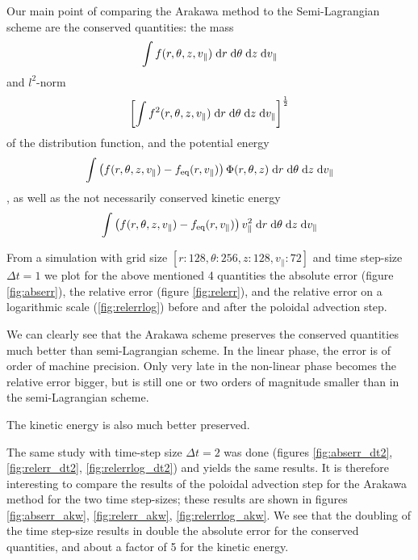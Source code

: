 Our main point of comparing the Arakawa method to the Semi-Lagrangian scheme are the conserved quantities: the mass
\begin{equation}
	\int f(r, \theta, z, v_\parallel) \;\text{d} r \;\text{d} \theta \;\text{d} z \;\text{d} v_\parallel
\end{equation}
and $l^2$-norm
\begin{equation}
	\left[\int f^2(r, \theta, z, v_\parallel) \;\text{d} r \;\text{d} \theta \;\text{d} z \;\text{d} v_\parallel\right]^\frac{1}{2}
\end{equation}
of the distribution function, and the potential energy
\begin{equation}
	\int \left(f(r, \theta, z, v_\parallel) - f_\text{eq}(r, v_\parallel)\right) \Phi(r, \theta, z) \;\text{d} r \;\text{d} \theta \;\text{d} z \;\text{d} v_\parallel
\end{equation}
, as well as the not necessarily conserved kinetic energy
\begin{equation}
	\int \left(f(r, \theta, z, v_\parallel) - f_\text{eq}(r, v_\parallel)\right) v^2_\parallel \;\text{d} r \;\text{d} \theta \;\text{d} z \;\text{d} v_\parallel
\end{equation}

From a simulation with grid size $[r:128, \theta:256, z:128, v_\parallel :72]$ and time step-size $\Delta t = 1$ we plot for the above mentioned 4 quantities the absolute error (figure \ref{fig:abserr}), the relative error (figure \ref{fig:relerr}), and the relative error on a logarithmic scale (\ref{fig:relerrlog}) before and after the poloidal advection step.

We can clearly see that the Arakawa scheme preserves the conserved quantities much better than semi-Lagrangian scheme. In the linear phase, the error is of order of machine precision. Only very late in the non-linear phase becomes the relative error bigger, but is still one or two orders of magnitude smaller than in the semi-Lagrangian scheme.

The kinetic energy is also much better preserved.

The same study with time-step size $\Delta t = 2$ was done (figures \ref{fig:abserr_dt2}, \ref{fig:relerr_dt2}, \ref{fig:relerrlog_dt2}) and yields the same results. It is therefore interesting to compare the results of the poloidal advection step for the Arakawa method for the two time step-sizes; these results are shown in figures \ref{fig:abserr_akw}, \ref{fig:relerr_akw}, \ref{fig:relerrlog_akw}. We see that the doubling of the time step-size results in double the absolute error for the conserved quantities, and about a factor of 5 for the kinetic energy.

